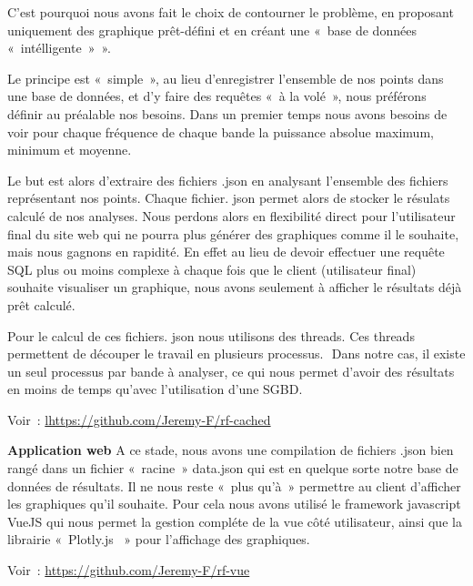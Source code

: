         C’est pourquoi nous avons fait le choix de contourner le problème, en proposant uniquement des graphique prêt-défini et en créant une « base de données  « intélligente » ».

        Le principe est « simple », au lieu d’enregistrer l’ensemble de nos points dans une base de données, et d’y faire des requêtes « à la volé », nous préférons définir au préalable nos besoins.
        Dans un premier temps nous avons besoins de voir pour chaque fréquence de chaque bande la puissance absolue maximum, minimum et moyenne.

        Le but est alors d’extraire des fichiers .json en analysant l’ensemble des fichiers représentant nos points. Chaque fichier. json permet alors de stocker le résulats calculé de nos analyses.
        Nous perdons alors en flexibilité direct pour l’utilisateur final du site web qui ne pourra plus générer des graphiques comme il le souhaite, mais nous gagnons en rapidité.
        En effet au lieu de devoir effectuer une requête SQL plus ou moins complexe à chaque fois que le client (utilisateur final) souhaite visualiser un graphique, nous avons seulement à afficher le résultats déjà prêt calculé.

        Pour le calcul de ces fichiers. json nous utilisons des threads. Ces threads permettent de découper le travail en plusieurs processus.  Dans notre cas, il existe un seul processus par bande à analyser, ce qui nous permet d’avoir des résultats en moins de temps qu’avec l’utilisation d’une SGBD.

        Voir : \url{lhttps://github.com/Jeremy-F/rf-cached}


        \textbf{Application web}
        A ce stade, nous avons une compilation de fichiers .json bien rangé dans un fichier « racine » data.json qui est en quelque sorte notre base de données de résultats. Il ne nous reste « plus qu’à » permettre au client d’afficher les graphiques qu’il souhaite.
        Pour cela nous avons utilisé le framework javascript VueJS \cite{vuejs_doc} qui nous permet la gestion compléte de la vue côté utilisateur, ainsi que la librairie « Plotly.js \cite{plotly_doc} » pour l’affichage des graphiques.

        Voir : \url{https://github.com/Jeremy-F/rf-vue}


